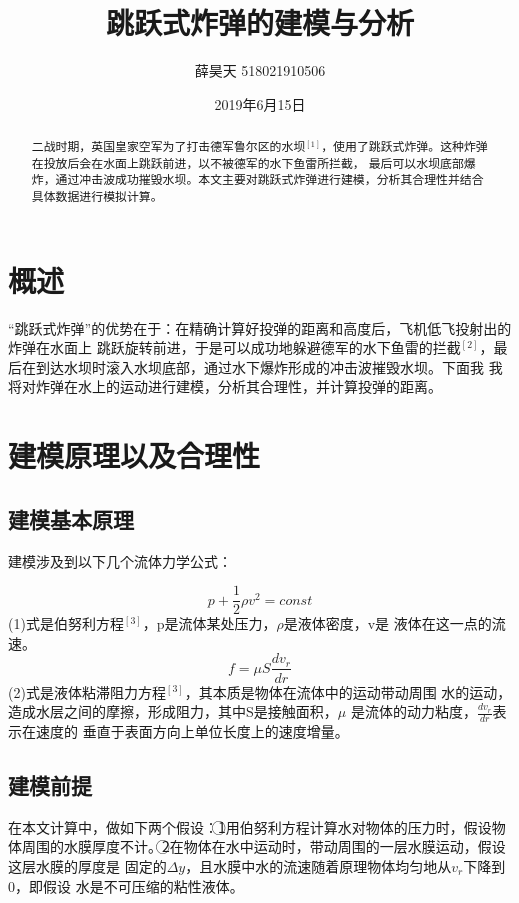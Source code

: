 \documentclass[UTF8]{ctexart}
\begin{document}
\title{\textbf{跳跃式炸弹的建模与分析}}
\author{薛昊天  518021910506}
\date{2019年6月15日}
\maketitle
\begin{abstract}
  二战时期，英国皇家空军为了打击德军鲁尔区的水坝$^{[1]}$，使用了跳跃式炸弹。这种炸弹在投放后会在水面上跳跃前进，以不被德军的水下鱼雷所拦截，
  最后可以水坝底部爆炸，通过冲击波成功摧毁水坝。本文主要对跳跃式炸弹进行建模，分析其合理性并结合具体数据进行模拟计算。

\end{abstract} 

 \section{概述}
      “跳跃式炸弹”的优势在于：在精确计算好投弹的距离和高度后，飞机低飞投射出的炸弹在水面上
      跳跃旋转前进，于是可以成功地躲避德军的水下鱼雷的拦截$^{[2]}$，最后在到达水坝时滚入水坝底部，通过水下爆炸形成的冲击波摧毁水坝。下面我
      我将对炸弹在水上的运动进行建模，分析其合理性，并计算投弹的距离。
  

 \section{建模原理以及合理性}
 \subsection{建模基本原理}

  建模涉及到以下几个流体力学公式：

       \begin{equation}
           p+\frac{1}{2}\rho{v^2}=const
       \end{equation}
          (1)式是伯努利方程$^{[3]}$，p是流体某处压力，$\rho$是液体密度，v是
       液体在这一点的流速。
       \begin{equation}
          f=\mu{S}\frac{dv_r}{dr} 
       \end{equation}
       (2)式是液体粘滞阻力方程$^{[3]}$，其本质是物体在流体中的运动带动周围
       水的运动，造成水层之间的摩擦，形成阻力，其中S是接触面积，$\mu$
        是流体的动力粘度，$\frac{dv_r}{dr}$表示在速度的
        垂直于表面方向上单位长度上的速度增量。
  
   
     
   \subsection{建模前提}
     在本文计算中，做如下两个假设：\textcircled{1}用伯努利方程计算水对物体的压力时，假设物体周围的水膜厚度不计。\textcircled{2}在物体在水中运动时，带动周围的一层水膜运动，假设这层水膜的厚度是
       固定的$\Delta{y}$，且水膜中水的流速随着原理物体均匀地从$v_r$下降到0，即假设
       水是不可压缩的粘性液体。
\end{document}
